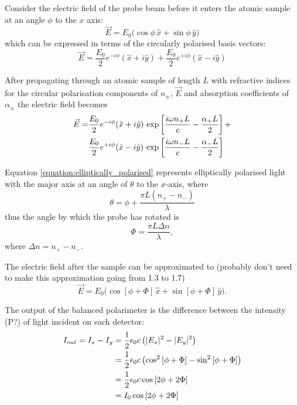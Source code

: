 Consider the electric field of the probe beam before it enters the atomic sample at an angle $\phi$ to the $x$ axis:
\begin{equation}
\vec{E}=E_0\big(\cos{\phi}\,\hat{x}+\sin{\phi}\,\hat{y}\big)
\end{equation}
which can be expressed in terms of the circularly polarised basis vectors:
\begin{equation}
\vec{E} = \frac{E_0}{2}e^{-i\phi}(\hat{x}+i\hat{y}) + \frac{E_0}{2}e^{+i\phi}(\hat{x}-i\hat{y})
\end{equation}

After propagating through an atomic sample of length $L$ with refractive indices for the circular polarisation components of $n_\pm$, $\vec{E}$ and absorption coefficients of $\alpha_\pm$ the electric field becomes
\begin{align}
\vec{E} = &\frac{E_0}{2}e^{-i\phi}(\hat{x}+i\hat{y})\,\exp\left[\frac{i\omega n_+ L}{c} - \frac{\alpha_+ L}{2}\right] +\notag\\
&\frac{E_0}{2}e^{+i\phi}(\hat{x}-i\hat{y})\,\exp\left[\frac{i\omega n_- L}{c} - \frac{\alpha_- L}{2}\right]\label{equation:elliptically_polarised}
\end{align}

Equation \ref{equation:elliptically_polarised} represents elliptically polarised light with the major axis at an angle of $\theta$ to the $x$-axis, where
\begin{equation}
\theta = \phi + \frac{\pi L (n_+ - n_-)}{\lambda}
\end{equation}
thus the angle by which the probe has rotated is
\begin{equation}
\Phi = \frac{\pi L \Delta n}{\lambda},
\end{equation}
where $\Delta n = n_+ - n_-$.

The electric field after the sample can be approximated to {\color{red}(probably don't need to make this approximation going from 1.3 to 1.7)}
\begin{equation}
\vec{E} = E_0\big(\cos\left[\phi+\Phi\right]\,\hat{x}+\sin\left[\phi+\Phi\right]\,\hat{y}\big).
\end{equation}

The output of the balanced polarimeter is the difference between the intensity {\color{red}(P?)} of light incident on each detector:
\begin{align}
I_{out} = I_x - I_y &= \frac{1}{2}\epsilon_0 c \left(|E_x|^2 - |E_y|^2\right)\notag\\
&= \frac{1}{2}\epsilon_0 c \left(\cos^2\left[\phi+\Phi\right] - \sin^2\left[\phi+\Phi\right]\right)\notag\\
&= \frac{1}{2}\epsilon_0 c \cos\left[2\phi+2\Phi\right]\notag\\
&= I_0 \cos\left[2\phi+2\Phi\right]
\end{align}

